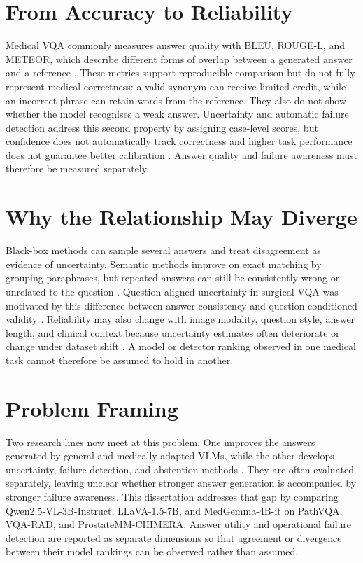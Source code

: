 \section{From Accuracy to Reliability}

Medical VQA commonly measures answer quality with BLEU, ROUGE-L, and METEOR, which describe different forms of overlap between a generated answer and a reference \citep{papineni2002bleu,lin2004rouge,banerjee2005meteor}. These metrics support reproducible comparison but do not fully represent medical correctness: a valid synonym can receive limited credit, while an incorrect phrase can retain words from the reference. They also do not show whether the model recognises a weak answer. Uncertainty and automatic failure detection address this second property by assigning case-level scores, but confidence does not automatically track correctness and higher task performance does not guarantee better calibration \citep{guo2017calibration,jiang2021whenknow}. Answer quality and failure awareness must therefore be measured separately.

\section{Why the Relationship May Diverge}

Black-box methods can sample several answers and treat disagreement as evidence of uncertainty. Semantic methods improve on exact matching by grouping paraphrases, but repeated answers can still be consistently wrong or unrelated to the question \citep{farquhar2024semanticentropy,nguyen2025pairwisesemantic}. Question-aligned uncertainty in surgical VQA was motivated by this difference between answer consistency and question-conditioned validity \citep{carlini2026qasnne}. Reliability may also change with image modality, question style, answer length, and clinical context because uncertainty estimates often deteriorate or change under dataset shift \citep{ovadia2019uncertainty}. A model or detector ranking observed in one medical task cannot therefore be assumed to hold in another.

\section{Problem Framing}

Two research lines now meet at this problem. One improves the answers generated by general and medically adapted VLMs, while the other develops uncertainty, failure-detection, and abstention methods \citep{li2023llavamed,sellergren2025medgemma,geifman2017selective}. They are often evaluated separately, leaving unclear whether stronger answer generation is accompanied by stronger failure awareness. This dissertation addresses that gap by comparing Qwen2.5-VL-3B-Instruct, LLaVA-1.5-7B, and MedGemma-4B-it on PathVQA, VQA-RAD, and ProstateMM-CHIMERA. Answer utility and operational failure detection are reported as separate dimensions so that agreement or divergence between their model rankings can be observed rather than assumed.
